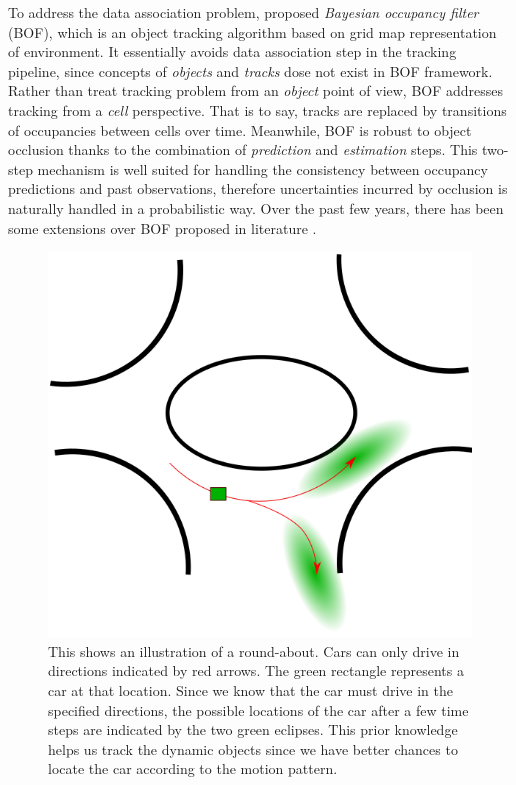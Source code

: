 To address the data association problem, \citet{coue2006bayesian} proposed \textit{Bayesian occupancy filter} (BOF), which is an object tracking algorithm based on grid map representation of environment. It essentially avoids data association step in the tracking pipeline, since concepts of \textit{objects} and \textit{tracks} dose not exist in BOF framework. Rather than treat tracking problem from an \textit{object} point of view, BOF addresses tracking from a \textit{cell} perspective. That is to say, tracks are replaced by transitions of occupancies between cells over time. Meanwhile, BOF is robust to object occlusion thanks to the combination of \textit{prediction} and \textit{estimation} steps. This two-step mechanism is well suited for handling the consistency between occupancy predictions and past observations, therefore uncertainties incurred by occlusion is naturally handled in a probabilistic way. Over the past few years, there has been some extensions over BOF proposed in literature \citep{gindele2009bayesian, brechtel2010recursive, llamazares2013dynamic}. 

\begin{figure}[H]
  \centering
    \includegraphics[width=.5\textwidth]{figures/roundabout.png}
    \caption[An illustration of a round-about]{This shows an illustration of a round-about. Cars can only drive in directions indicated by red arrows. The green rectangle represents a car at that location. Since we know that the car must drive in the specified directions, the possible locations of the car after a few time steps are indicated by the two green eclipses. This prior knowledge helps us track the dynamic objects since we have better chances to locate the car according to the motion pattern.}
    \label{fig:roundabout_idea}
\end{figure}


